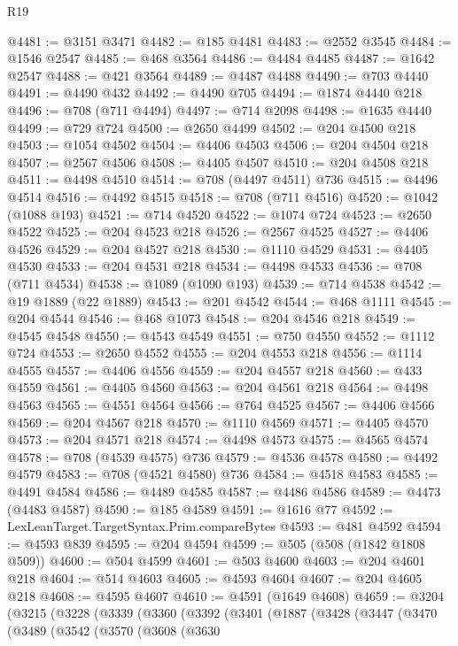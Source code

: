 \begin{lexlean}{R19}
\begin{coremodule}
{{{{{{{{{{{@4481 := @3151 @3471
@4482 := @185 @4481
@4483 := @2552 @3545
@4484 := @1546 @2547
@4485 := @468 @3564
@4486 := @4484 @4485
@4487 := @1642 @2547
@4488 := @421 @3564
@4489 := @4487 @4488
@4490 := @703 @4440
@4491 := @4490 @432
@4492 := @4490 @705
@4494 := @1874 @4440 @218
@4496 := @708 (@711 @4494)
@4497 := @714 @2098
@4498 := @1635 @4440
@4499 := @729 @724
@4500 := @2650 @4499
@4502 := @204 @4500 @218
@4503 := @1054 @4502
@4504 := @4406 @4503
@4506 := @204 @4504 @218
@4507 := @2567 @4506
@4508 := @4405 @4507
@4510 := @204 @4508 @218
@4511 := @4498 @4510
@4514 := @708 (@4497 @4511) @736
@4515 := @4496 @4514
@4516 := @4492 @4515
@4518 := @708 (@711 @4516)
@4520 := @1042 (@1088 @193)
@4521 := @714 @4520
@4522 := @1074 @724
@4523 := @2650 @4522
@4525 := @204 @4523 @218
@4526 := @2567 @4525
@4527 := @4406 @4526
@4529 := @204 @4527 @218
@4530 := @1110 @4529
@4531 := @4405 @4530
@4533 := @204 @4531 @218
@4534 := @4498 @4533
@4536 := @708 (@711 @4534)
@4538 := @1089 (@1090 @193)
@4539 := @714 @4538
@4542 := @19 @1889 (@22 @1889)
@4543 := @201 @4542
@4544 := @468 @1111
@4545 := @204 @4544
@4546 := @468 @1073
@4548 := @204 @4546 @218
@4549 := @4545 @4548
@4550 := @4543 @4549
@4551 := @750 @4550
@4552 := @1112 @724
@4553 := @2650 @4552
@4555 := @204 @4553 @218
@4556 := @1114 @4555
@4557 := @4406 @4556
@4559 := @204 @4557 @218
@4560 := @433 @4559
@4561 := @4405 @4560
@4563 := @204 @4561 @218
@4564 := @4498 @4563
@4565 := @4551 @4564
@4566 := @764 @4525
@4567 := @4406 @4566
@4569 := @204 @4567 @218
@4570 := @1110 @4569
@4571 := @4405 @4570
@4573 := @204 @4571 @218
@4574 := @4498 @4573
@4575 := @4565 @4574
@4578 := @708 (@4539 @4575) @736
@4579 := @4536 @4578
@4580 := @4492 @4579
@4583 := @708 (@4521 @4580) @736
@4584 := @4518 @4583
@4585 := @4491 @4584
@4586 := @4489 @4585
@4587 := @4486 @4586
@4589 := @4473 (@4483 @4587)
@4590 := @185 @4589
@4591 := @1616 @77
@4592 := LexLeanTarget.TargetSyntax.Prim.compareBytes
@4593 := @481 @4592
@4594 := @4593 @839
@4595 := @204 @4594
@4599 := @505 (@508 (@1842 @1808 @509))
@4600 := @504 @4599
@4601 := @503 @4600
@4603 := @204 @4601 @218
@4604 := @514 @4603
@4605 := @4593 @4604
@4607 := @204 @4605 @218
@4608 := @4595 @4607
@4610 := @4591 (@1649 @4608)
@4659 := @3204
    (@3215
      (@3228
        (@3339
          (@3360
            (@3392
              (@3401
                (@1887
                  (@3428
                    (@3447
                      (@3470
                        (@3489
                          (@3542
                            (@3570
                              (@3608
                                (@3630
}}}}}}}}}}}
\end{coremodule}
\end{lexlean}
